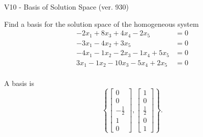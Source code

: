 \begin{exercise}
  \begin{exerciseTitle}V10 - Basis of Solution Space (ver. 930)\end{exerciseTitle}
  \begin{exerciseStatement}
    Find a basis for the solution space of the homogeneous system 
\begin{align*}
 -2 x_ 1 + 8 x_ 3 + 4 x_ 4 -2 x_ 5 &= 0  \\ 
  -3 x_ 1 -4 x_ 2 + 3 x_ 5 &= 0  \\ 
  -4 x_ 1 -1 x_ 2 -2 x_ 3 -1 x_ 4 + 5 x_ 5 &= 0  \\ 
  3 x_ 1 -1 x_ 2 -10 x_ 3 -5 x_ 4 + 2 x_ 5 &= 0  \\ 
 \end{align*}


 
  \end{exerciseStatement}

  \begin{exerciseAnswer}
   A basis is   
\[\left\{\left[\begin{array}{c}
0 \\
0 \\
-\frac{1}{2} \\
1 \\
0
\end{array}\right] , \left[\begin{array}{c}
1 \\
0 \\
\frac{1}{2} \\
0 \\
1
\end{array}\right]\right\}.\]

  


  \end{exerciseAnswer}
\end{exercise}